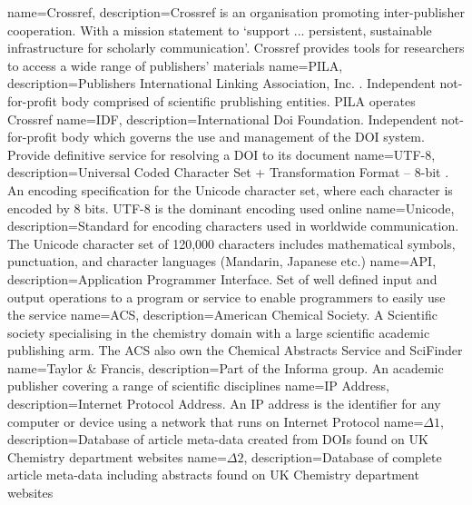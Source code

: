 {
name={Crossref},
description={Crossref is an organisation promoting inter-publisher cooperation. With a mission statement to `support ... persistent, sustainable infrastructure for scholarly communication'\cite{crossref-formation}. Crossref provides  tools for researchers to access a wide range of publishers' materials} 
}
{
name={PILA},
description={Publishers International Linking Association, Inc. . Independent not-for-profit body comprised of scientific prublishing entities. PILA operates Crossref \cite{crossref-formation}} 
}
{ 
name={IDF},
description={International Doi Foundation. Independent not-for-profit body which governs the use and management of the DOI system. Provide definitive service for resolving a DOI to its document \cite{doi_handbook2}} 
}
{
name={UTF-8},
description={Universal Coded Character Set + Transformation Format – 8-bit \cite{utf8}. An encoding specification for the Unicode character set, where each character is encoded by 8 bits. UTF-8 is the dominant encoding used online \cite{utf8stats}} 
}
{
name={Unicode},
description={Standard for encoding characters used in worldwide communication. The Unicode character set of 120,000 characters includes mathematical symbols, punctuation, and character languages (Mandarin, Japanese etc.)} 
}
{
name={API},
description={Application Programmer Interface. Set of well defined input and output operations to a program or service to enable programmers to easily use the service} 
}
{
name={ACS},
description={American Chemical Society. A Scientific society specialising in the chemistry domain with a large scientific academic publishing arm. The ACS also own the Chemical Abstracts Service and SciFinder\textsuperscript{\textregistered}} 
}
{
name={Taylor \& Francis},
description={Part of the Informa group. An academic publisher covering a range of scientific disciplines} 
}
{
name={IP Address},
description={Internet Protocol Address. An IP address is the identifier for any computer or device using a network that runs on Internet Protocol} 
}
{
name={$\Delta1$},
description={Database of article meta-data created from DOIs found on UK Chemistry department websites} 
}
{
name={$\Delta2$},
description={Database of complete article meta-data including abstracts found on UK Chemistry department websites} 
}
